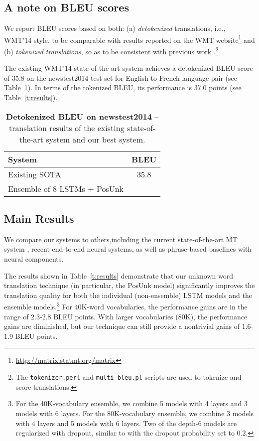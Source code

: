 \documentclass[11pt]{article}
\begin{document}
\subsection{A note on BLEU scores}
We report BLEU scores based on both: (a) {\it detokenized} translations, i.e., WMT'14 style, to be comparable with results reported on the WMT website\footnote{\url{http://matrix.statmt.org/matrix}} and (b) {\it tokenized translations}, so as to be consistent with previous work \cite{cho14,bog15,wmt14_en_fr,sutskever14,jean15}.\footnote{The \texttt{tokenizer.perl} and \texttt{multi-bleu.pl} scripts are used to tokenize and score translations.}

The existing WMT'14 state-of-the-art system \cite{durrani-EtAl:2014:W14-33} achieves a detokenized BLEU score of 35.8 on 
the newstest2014 test set for English to French language pair (see Table~\ref{t:results_wmt}). In terms of the tokenized BLEU, its performance is 37.0 points (see Table~\ref{t:results}).
\begin{table}[tbh!]
\centering
\begin{tabular}{l|c}
\bf{System} & \bf{BLEU}\\
  \hline
Existing SOTA \cite{durrani-EtAl:2014:W14-33} & 35.8\\
\hline
Ensemble of 8 LSTMs + PosUnk  & {\bf \bestbleuunkwmt{}}\\
\end{tabular}
\caption{{\bf Detokenized BLEU on newstest2014} -- translation results of the existing state-of-the-art system and our best system.}
\label{t:results_wmt}
\end{table}


\subsection{Main Results}
We compare our systems to others,including the current state-of-the-art MT system \cite{durrani-EtAl:2014:W14-33},
recent end-to-end neural systems, as well as phrase-based baselines with neural components.

The results shown in Table~\ref{t:results} demonstrate that our unknown word translation technique (in particular, the PosUnk model) significantly improves the translation quality for both the individual (non-ensemble) LSTM models and the ensemble models.\footnote{
For the 40K-vocabulary ensemble, we combine 5 models with 4 layers and 3 models with 6 layers. For the 80K-vocabulary ensemble, we combine 3 models with 4 layers and 5 models with 6 layers. Two of the depth-6 models are regularized with dropout, similar to  with the dropout probability set to 0.2.} 
For 40K-word vocabularies, the performance gains are in the range of 2.3-2.8 BLEU points. With larger vocabularies (80K), the performance gains are diminished, but our technique can still provide a nontrivial gains of 1.6-1.9 BLEU points. 
\end{document}
